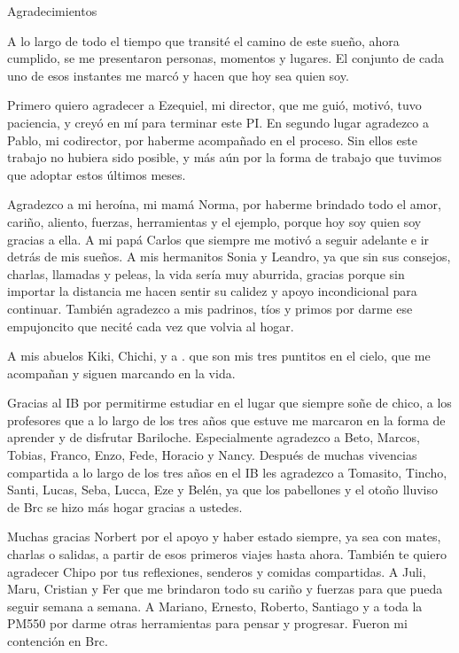 \documentclass[12pt,papel,oneside]{ibtesis}
\begin{document}
\begin{postliminary}

\listoffigures                  %

\listoftables                   %






\begin{seccion}{Agradecimientos}
\begin{footnotesize}	
	
A lo largo de todo el tiempo que transité el camino de este sueño, ahora cumplido, se me presentaron personas, momentos y lugares. El conjunto de cada uno de esos instantes me marcó y hacen que hoy sea quien soy.

Primero quiero agradecer a Ezequiel, mi director, que me guió, motivó, tuvo paciencia, y creyó en mí para terminar este PI. En segundo lugar agradezco a Pablo, mi codirector, por haberme acompañado en el proceso. Sin ellos este trabajo no hubiera sido posible, y más aún por la forma de trabajo que tuvimos que adoptar estos últimos meses.

Agradezco a mi heroína, mi mamá Norma, por haberme brindado todo el amor, cariño, aliento, fuerzas, herramientas y el ejemplo, porque  hoy soy quien soy gracias a ella. A mi papá Carlos que siempre me motivó a seguir adelante e ir detrás de mis sueños. A mis hermanitos Sonia y Leandro, ya que sin sus consejos, charlas, llamadas y peleas, la vida sería muy aburrida, gracias porque sin importar la distancia me hacen sentir su calidez y apoyo incondicional para continuar. También agradezco a mis padrinos, tíos y primos por darme ese empujoncito que necité cada vez que volvia al hogar.

A mis abuelos Kiki, Chichi, y a . que son mis tres puntitos en el cielo, que me acompañan y siguen marcando en la vida.

Gracias al IB por permitirme estudiar en el lugar que siempre soñe de chico, a los profesores que a lo largo de los tres años que estuve me marcaron en la forma de aprender y de disfrutar Bariloche. Especialmente agradezco a Beto, Marcos, Tobias, Franco, Enzo, Fede, Horacio y Nancy. Después de muchas vivencias compartida a lo largo de los tres años en el IB les agradezco a Tomasito, Tincho, Santi, Lucas, Seba, Lucca, Eze y Belén, ya que los pabellones y el otoño lluviso de Brc se hizo más hogar gracias a ustedes. 

Muchas gracias Norbert por el apoyo y haber estado siempre, ya sea con mates, charlas o salidas, a partir de esos primeros viajes hasta ahora. También te quiero agradecer Chipo por tus reflexiones, senderos y comidas compartidas. A Juli, Maru, Cristian y Fer que me brindaron todo su cariño y fuerzas para que pueda seguir semana a semana. A Mariano, Ernesto, Roberto, Santiago y a toda la PM550 por darme otras herramientas para pensar y progresar. Fueron mi contención en Brc.


\end{footnotesize}
\end{seccion}
\end{postliminary}
\end{document}
